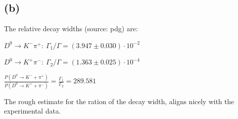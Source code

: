 \documentclass[11pt]{article}
\begin{document}
    \hypertarget{b}{%
\subsection{(b)}\label{b}}

The relative decay widths (source: pdg) are:

\(D^0 \to K^-\pi^+: \ \Gamma_1/\Gamma = (3.947\pm0.030)\cdot10^{-2}\)

\(D^0 \to K^+\pi^-: \ \Gamma_2/\Gamma = (1.363\pm0.025)\cdot 10^{-4}\)

\(\frac{P(D^0\to K^- + \pi^+)}{P(D^0\to K^+ + \pi^-)} = \frac{\Gamma_1}{\Gamma_2} = 289.581\)

The rough estimate for the ration of the decay width, aligns nicely with
the experimental data.


    
    
    
\end{document}
